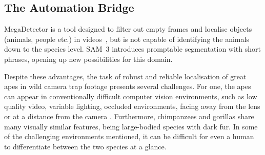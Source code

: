 \documentclass[author={Jacob Stephenson},
    degree={BSc},
    title={Robust Great Ape Species Detection in Wild Camera Trap Imagery with Promptable Concept Segmentation},
    unit={COMS30045},
    subtitle={}]{dissertation}
\begin{document}
\subsection{The Automation Bridge}
\label{sec:intro_auto}

MegaDetector is a tool designed to filter out empty frames and localise objects (animals, people etc.) in videos~\cite{beery2019efficientpipelinecameratrap}, but is not capable of identifying the animals down to the species level. SAM~3 introduces promptable segmentation with short phrases, opening up new possibilities for this domain.

Despite these advantages, the task of robust and reliable localisation of great apes in wild camera trap footage presents several challenges. For one, the apes can appear in conventionally difficult computer vision environments, such as low quality video, variable lighting, occluded environments, facing away from the lens or at a distance from the camera \cite{brookes2024panaf20k, yang2019greatapedetectionchallenging}. Furthermore, chimpanzees and gorillas share many visually similar features, being large-bodied species with dark fur. In some of the challenging environments mentioned, it can be difficult for even a human to differentiate between the two species at a glance.



\end{document}
